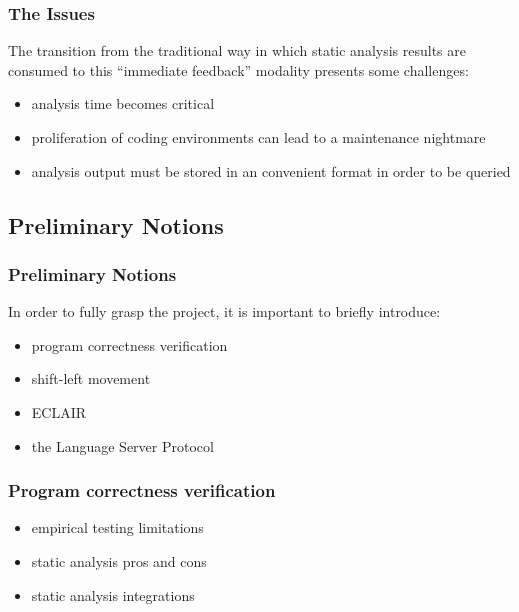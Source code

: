 \documentclass[compress,xcolor={dvipsnames}]{beamer}
\begin{document}
\begin{frame}
  \frametitle{The Issues}

  The transition from the traditional way in which static analysis results are consumed to this ``immediate feedback'' modality presents some challenges:

  \begin{itemize}
    \setlength\itemsep{1em}
  
  \item analysis time becomes critical

  \item proliferation of coding environments can lead to a maintenance nightmare

  \item analysis output must be stored in an convenient format in order to be queried

  \end{itemize}
\end{frame}


\subsection{Preliminary Notions}

\begin{frame}
  \frametitle{Preliminary Notions}

  In order to fully grasp the project, it is important to briefly introduce:

  \begin{itemize}
    \setlength\itemsep{1em}
  
  \item program correctness verification

  \item shift-left movement

  \item ECLAIR

  \item the Language Server Protocol

  \end{itemize}
\end{frame}

\begin{frame}
  \frametitle{Program correctness verification}

  \begin{itemize}
    \setlength\itemsep{2em}
  
  \item empirical testing limitations

  \item static analysis pros and cons

  \item static analysis integrations

  \end{itemize}
\end{frame}
\end{document}
